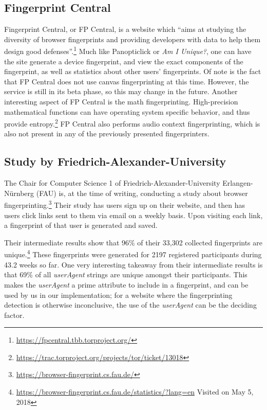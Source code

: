 \documentclass[
    fontsize=12pt,
    headings=small,
    parskip=half,
    bibliography=totoc,
    numbers=noenddot,
    open=any
    ]{scrreprt}
\begin{document}
\subsection{Fingerprint Central}
\label{related_work:fp_central}
Fingerprint Central, or FP Central, is a website which ``aims at studying the diversity
of browser fingerprints and providing developers with data to help them design good defenses''.\footnote{\url{https://fpcentral.tbb.torproject.org/}}
Much like Panopticlick or \textit{Am I Unique?}, one can have the site generate a device fingerprint,
and view the exact components of the fingerprint, as well as statistics about other users' fingerprints.
Of note is the fact that FP Central does not use canvas fingerprinting at this time.
However, the service is still in its beta phase, so this may change in the future.
Another interesting aspect of FP Central is the math fingerprinting.
High-precision mathematical functions can have operating system specific behavior, and thus provide
entropy.\footnote{\url{https://trac.torproject.org/projects/tor/ticket/13018}}
FP Central also performs audio context fingerprinting, which is also not present in any of the previously presented
fingerprinters.

\subsection{Study by Friedrich-Alexander-University}
The Chair for Computer Science 1 of Friedrich-Alexander-University Erlangen-Nürnberg (FAU)
is, at the time of writing, conducting a study about
browser fingerprinting.\footnote{\url{https://browser-fingerprint.cs.fau.de/}}
Their study has users sign up on their website, and then has users click links
sent to them via email on a weekly basis. Upon visiting each link, a fingerprint of that user is
generated and saved.

Their intermediate results show that 96\% of their 33,302 collected fingerprints are
unique.\footnote{\url{https://browser-fingerprint.cs.fau.de/statistics/?lang=en} Visited on May 5, 2018}
These fingerprints were generated for 2197 registered participants during 43.2 weeks so far.
One very interesting takeaway from their intermediate results is that 69\%
of all \textit{userAgent} strings are unique amongst their participants.
This makes the \textit{userAgent} a prime attribute to include in a fingerprint,
and can be used by us in our implementation; for a website where the fingerprinting detection
is otherwise inconclusive, the use of the \textit{userAgent} can be the deciding factor.
\end{document}
